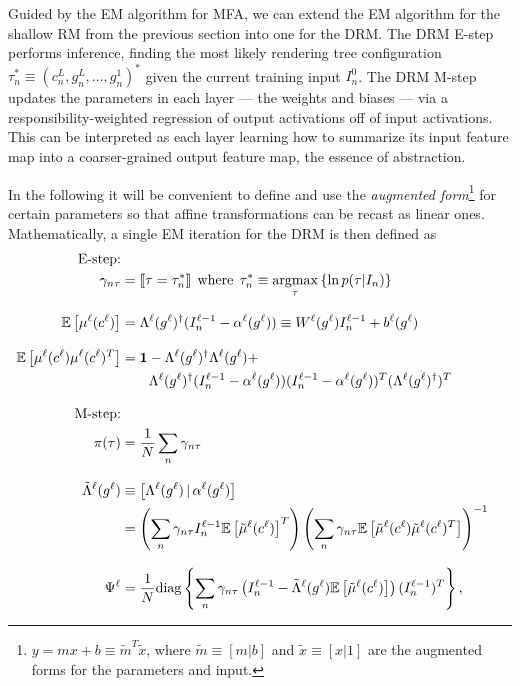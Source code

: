 \documentclass[12pt]{article}
\newcommand{\Expect}[0]{{ \mathbb{E} }}
\DeclareMathOperator*{\argmax}{argmax}
\newcommand{\dg}[0]{{ \dagger }}
\begin{document}
Guided by the EM algorithm for MFA\cite{ghahramani1996algorithm}, we can extend the EM algorithm for the shallow RM from the previous section into one for the DRM. The DRM E-step performs inference, finding the most likely rendering tree configuration $\tau_n^* \equiv (c_n^L, g_n^L, \ldots, g_n^1)^*$ given the current training input $I_n^0$. The DRM M-step updates the parameters in each layer --- the weights and biases --- via a responsibility-weighted regression of output activations off of input activations. This can be interpreted as each layer learning how to summarize its input feature map into a coarser-grained output feature map, the essence of abstraction. 

In the following it will be convenient to define and use the {\em augmented form}\footnote{$y = mx + b \equiv \tilde{m}^{T} \tilde{x}$, where $\tilde{m} \equiv [ m | b ]$ and $\tilde{x} \equiv [x | 1]$ are the augmented forms for the parameters and input.} for certain parameters so that affine transformations can be recast as linear ones. Mathematically, a single EM iteration for the DRM is then defined as
\begin{align} 
   \textrm{E-step:} \nonumber \\
   	\gamma_{n\tau} &= \llbracket \tau = \tau_{n}^{*} \rrbracket \:\: \textrm{where} \:\: \tau_{n}^{*} \equiv \argmax_{\tau}\left \{\ln p(\tau | I_{n})\right \} \label{eqn:FwdProp} \\[3mm]
   	\Expect \left[ \mu^{\ell}(c^{\ell}) \right] 
	    	&=  \Lambda^{\ell}(g^{\ell})^{\dg}(I^{\ell-1}_{n} - \alpha^{\ell}(g^{\ell})) \equiv W^{\ell}(g^{\ell})I^{\ell-1}_{n} + b^{\ell}(g^{\ell})   \\[3mm]
    	\Expect \left[\mu^{\ell}(c^{\ell})\mu^{\ell}(c^{\ell})^{T} \right] &= \mathbf{1} - \Lambda^{\ell}(g^{\ell})^{\dg}\Lambda^{\ell}(g^{\ell}) + \nonumber\\
	&\qquad \Lambda^{\ell}(g^{\ell})^{\dg}(I^{\ell-1}_{n} - 		\alpha^{\ell}(g^{\ell}))(I^{\ell-1}_{n} - \alpha^{\ell}(g^{\ell}))^{T}(\Lambda^{\ell}(g^{\ell})^{\dg})^{T}  \\[3mm]
    \textrm{M-step:} \nonumber\\
    	\pi(\tau) &= \frac{1}{N} \sum_{n}\gamma_{n\tau} 
	\\[3mm]
    	 \tilde{\Lambda}^{\ell}(g^{\ell}) &\equiv \left[\Lambda^{\ell}(g^{\ell}) \,|\, \alpha^{\ell}(g^{\ell}) \right] 
	 \nonumber\\
    	&= \left(\sum_{n}\gamma_{n\tau}I^{\ell-1}_{n} \Expect \left[ \tilde{\mu}^{\ell}(c^{\ell}) \right]^{T}\right)\left(\sum_{n}\gamma_{n	\tau}\Expect \left[\tilde{\mu}^{\ell}(c^{\ell})\tilde{\mu}^{\ell}(c^{\ell})^{T} \right]\right)^{-1} 
	\\[3mm]
	\Psi^{\ell} &= \frac{1}{N}{\rm diag}\left\{\sum_{n}\gamma_{n\tau}\left(I_{n}^{\ell-1}-\tilde{\Lambda}^{\ell}(g^{\ell})\Expect \left[\tilde{\mu}^{\ell}(c^{\ell}) \right] \right)(I_{n}^{\ell-1})^{T}\right\},	
	\label{eqn:MDRM}
\end{align}
\end{document}
